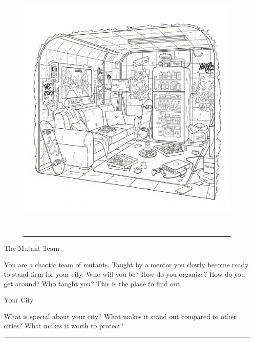 
\vspace*{\fill}

\begin{figure}[h!]
\centering\includegraphics[height=13cm]{images/hideout.png}
\vspace{-\baselineskip}\vspace{+0.1pt}
\rule{\linewidth}{2pt}
\end{figure}
\Huge{}The Mutant Team

\normalfont\large
\medskip

You are a chaotic team of mutants. Taught by a mentor you slowly become ready to stand firm for your city. Who will you be? How do you organize? How do you get around? Who taught you? This is the place to find out.

\newpage

\Large{}Your City
\normalfont\large
\medskip

What is special about your city? What makes it stand out compared to other cities? What makes it worth to protect? \rule{0.5\linewidth}{1pt}

\medskip


